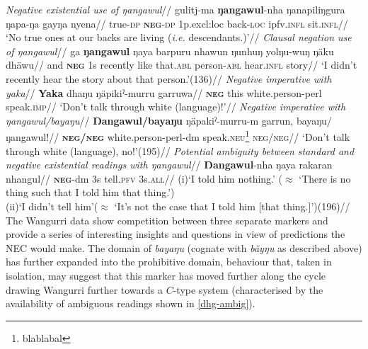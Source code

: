 \documentclass[usenames,dvipsnames,11pt]{article}
\begin{document}
{\pex\a\begingl\glpreamble \textit{Negative existential use of {\em ŋangawul}}//
\gla gulitj-ma \textbf{ŋangawul}-nha ŋanapiliŋgura ŋapa-ŋa gayŋa nyena//
\glb true-\textsc{dp} \textsc{\textbf{neg}-dp} 1\gls{p}.\gls{excl}{:loc} back\textsc{-loc} \gls{ipfv}.\textsc{infl} sit.\textsc{infl}//
\glft`No true ones at our backs are living (\textit{i.e.} descendants.)'//
\endgl
\a\begingl\glpreamble\textit{Clausal negation use of {\em ŋangawul}}//
\gla ga \textbf{ŋangawul} ŋaya barpuru nhawun ŋunhuŋ yolŋu-wuŋ ŋäku dhäwu//
\glb and \textsc{\textbf{neg}} \gls{1}\gls{s} recently like that.\textsc{abl} person\textsc{-abl} hear\textsc{.infl} story//
\glft `I didn't recently hear the story about that person.'\trailingcitation(136)//
\endgl
\a\begingl\glpreamble\textit{Negative imperative with {\em yaka}}//
\gla \textbf{Yaka} dhaŋu ŋäpikiˀ-murru garruwa//
\glb \textsc{\textbf{neg}} this white.person-\gls{perl} speak\textsc{.imp}//
\glft`Don't talk through white (language)!'//
\endgl
\a\begingl\glpreamble\textit{Negative imperative with \emph{ŋangawul/bayaŋu}}//
\gla \textbf{Ŋangawul/bayaŋu} ŋäpakiˀ-murru-m garrun, bayaŋu/ŋangawul!//
\glb \textsc{\textbf{neg/neg}} white.person-\gls{perl}-\gls{dm} speak\textsc{.neu}\footnote{blablabal} \textsc{neg/neg}//
\glft `Don't talk through white (language), no!'\trailingcitation(195)//\endgl
\a\label{dhg-ambig}\begingl\glpreamble\textit{Potential ambiguity between standard and negative existential readings with \emph{ŋangawul}}//
\gla \textbf{Ŋangawul}-nha ŋaya rakaran nhangul//
\glb \textsc{\textbf{neg}}-\gls{dm} \gls{3}\gls{s} tell.\textsc{pfv} 3s.\textsc{all}//
\glft(i)\quad`I told him nothing.' ($\approx$ `There is no thing such that I told him that thing.')\\
(ii)\quad `I didn't tell him'($\approx$ `It's not the case that I told him [that thing.]')\trailingcitation(196)//\endgl
\xe
{}
The Wangurri data show competition between three separate markers and provide a series of interesting insights and questions in view of predictions the NEC would make. The domain of \textit{bayaŋu} (cognate with \textit{bäyŋu} as described above) has further expanded into the prohibitive domain, behaviour that, taken in isolation, may suggest that this marker has moved further along the cycle drawing Wangurri further towards a $C$-type system (characterised by the availability of ambiguous readings shown in \ref{dhg-ambig}).

}
\end{document}
